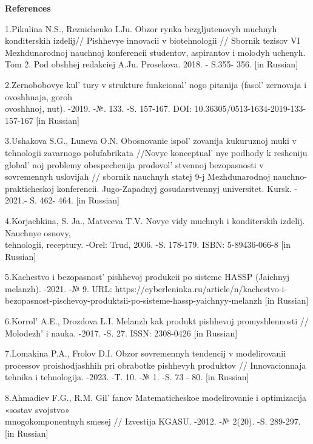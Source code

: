 \begin{center}
{\bfseries References}
\end{center}

\begin{references}
1.Pikulina N.S., Reznichenko I.Ju. Obzor rynka bezgljutenovyh muchnyh
konditerskih izdelij// Pishhevye innovacii v biotehnologii // Sbornik
tezisov VI Mezhdunarodnoj nauchnoj konferencii studentov, aspirantov i
molodyh uchenyh. Tom 2. Pod obshhej redakciej A.Ju. Prosekova. 2018. -
S.355- 356. {[}in Russian{]}

2.Zernobobovye kul' tury v strukture
funkcional' nogo pitanija (fasol'{}
zernovaja i ovoshhnaja, goroh \\ovoshhnoj, nut). -2019. -№. 133. -S.
157-167. DOI: 10.36305/0513-1634-2019-133-157-167 {[}in Russian{]}

3.Ushakova S.G., Luneva O.N. Obosnovanie ispol' zovanija
kukuruznoj muki v tehnologii zavarnogo polufabrikata //Novye
konceptual' nye podhody k resheniju
global' noj problemy obespechenija
prodovol' stvennoj bezopasnosti v sovremennyh uslovijah
// sbornik nauchnyh statej 9-j Mezhdunarodnoj nauchno-prakticheskoj
konferencii. Jugo-Zapadnyj gosudarstvennyj universitet. Kursk. - 2021.-
S. 462- 464. {[}in Russian{]}

4.Korjachkina, S. Ja., Matveeva T.V. Novye vidy muchnyh i konditerskih
izdelij. Nauchnye osnovy, \\tehnologii, receptury. -Orel: Trud, 2006. -S.
178-179. ISBN: 5-89436-066-8 {[}in Russian{]}

5.Kachestvo i bezopasnost'{} pishhevoj produkcii po
sisteme HASSP (Jaichnyj melanzh). -2021. -№ 9. URL:
https://cyberleninka.ru/article/n/kachestvo-i-bezopasnost-pischevoy-produktsii-po-sisteme-hassp-yaichnyy-melanzh
{[}in Russian{]}

6.Korrol'{} A.E., Drozdova L.I. Melanzh kak produkt
pishhevoj promyshlennosti // Molodezh'{} i nauka. -2017.
-S. 27. ISSN: 2308-0426 {[}in Russian{]}

7.Lomakina P.A., Frolov D.I. Obzor sovremennyh tendencij v modelirovanii
processov proishodjashhih pri obrabotke pishhevyh produktov //
Innovacionnaja tehnika i tehnologija. -2023. -T. 10. -№ 1. -S. 73 - 80.
{[}in Russian{]}

8.Ahmadiev F.G., R.M. Gil' fanov Matematicheskoe
modelirovanie i optimizacija «sostav svojstvo» \\mnogokomponentnyh smesej
// Izvestija KGASU. -2012. -№ 2(20). -S. 289-297. {[}in Russian{]}


\end{references}
